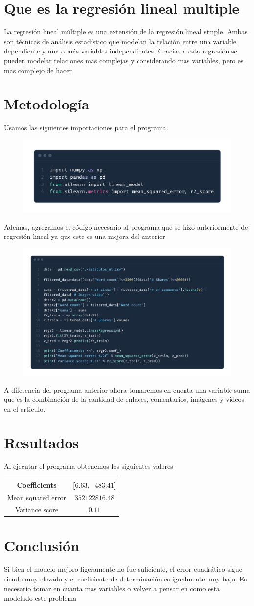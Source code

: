 \section{Que es la regresión lineal multiple}

La regresión lineal múltiple es una extensión de la regresión lineal simple. Ambas son técnicas de análisis estadístico que modelan la relación entre una variable dependiente y una o más variables independientes.
Gracias a esta regresión se pueden modelar relaciones mas complejas y considerando mas variables, pero es mas complejo de hacer

\section{Metodología}
Usamos las siguientes importaciones para el programa
\begin{figure}[h]
    \centering
    \includegraphics[width=0.5\linewidth]{image.png}
\end{figure}
Ademas, agregamos el código necesario al programa que se hizo anteriormente de regresión lineal ya que este es una mejora del anterior
\begin{figure}[h]
    \centering
    \includegraphics[width=0.5\linewidth]{image_2.png}
\end{figure}
A diferencia del programa anterior ahora tomaremos en cuenta una variable suma que es la combinación de la cantidad de enlaces, comentarios, imágenes y videos en el articulo.


\section{Resultados}
Al ejecutar el programa obtenemos los siguientes valores
\begin{table}[h]
    \centering
    \begin{tabular}{|c|c|} \hline 
        Coefficients & [$6.63$,$-483.41$]\\ \hline 
        Mean squared error& $352122816.48$\\ \hline 
        Variance score& $0.11$\\\hline
    \end{tabular}
\end{table}


\section{Conclusión}
Si bien el modelo mejoro ligeramente no fue suficiente, el error cuadrático sigue siendo muy elevado y el coeficiente de determinación es igualmente muy bajo.
Es necesario tomar en cuanta mas variables o volver a pensar en como esta modelado este problema